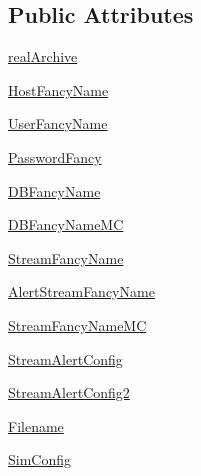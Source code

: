 \subsection*{Public Attributes}
\begin{DoxyCompactItemize}
\item 
\hyperlink{classamonpy_1_1dbase_1_1test_1_1test__db__write_1_1_test_d_b_write_a21f01f500a675067822bf868ce371306}{real\-Archive}
\item 
\hyperlink{classamonpy_1_1dbase_1_1test_1_1test__db__write_1_1_test_d_b_write_a1d99ea6d169624f39acc56254f9f7f30}{Host\-Fancy\-Name}
\item 
\hyperlink{classamonpy_1_1dbase_1_1test_1_1test__db__write_1_1_test_d_b_write_ab23c3c078c9ef84ff80e595d0906cd83}{User\-Fancy\-Name}
\item 
\hyperlink{classamonpy_1_1dbase_1_1test_1_1test__db__write_1_1_test_d_b_write_a69e2b25f75c000b814fa55d4945cd241}{Password\-Fancy}
\item 
\hyperlink{classamonpy_1_1dbase_1_1test_1_1test__db__write_1_1_test_d_b_write_a7b07a25b051063de016eaa355562eac3}{D\-B\-Fancy\-Name}
\item 
\hyperlink{classamonpy_1_1dbase_1_1test_1_1test__db__write_1_1_test_d_b_write_ad305c09b7cfbca1150be4b5819d0fdf4}{D\-B\-Fancy\-Name\-M\-C}
\item 
\hyperlink{classamonpy_1_1dbase_1_1test_1_1test__db__write_1_1_test_d_b_write_a12e956ebf3f624d6b36bb053369dd608}{Stream\-Fancy\-Name}
\item 
\hyperlink{classamonpy_1_1dbase_1_1test_1_1test__db__write_1_1_test_d_b_write_afe1cf31a726c2a34b3f8b3a5d130c3af}{Alert\-Stream\-Fancy\-Name}
\item 
\hyperlink{classamonpy_1_1dbase_1_1test_1_1test__db__write_1_1_test_d_b_write_a2096a0b2fb2fe15fcb2894f1a7d61c68}{Stream\-Fancy\-Name\-M\-C}
\item 
\hyperlink{classamonpy_1_1dbase_1_1test_1_1test__db__write_1_1_test_d_b_write_a2e1e2201ab54a4ea4eb59294ada2fd1a}{Stream\-Alert\-Config}
\item 
\hyperlink{classamonpy_1_1dbase_1_1test_1_1test__db__write_1_1_test_d_b_write_ae07bba8a08bbee7c7995a94a71d11f2a}{Stream\-Alert\-Config2}
\item 
\hyperlink{classamonpy_1_1dbase_1_1test_1_1test__db__write_1_1_test_d_b_write_a9d4454368eabffc5e634852d7f6bf809}{Filename}
\item 
\hyperlink{classamonpy_1_1dbase_1_1test_1_1test__db__write_1_1_test_d_b_write_a23801af3747df6a10fe1e3e087f41ddc}{Sim\-Config}
\item 

\end{DoxyCompactItemize}
